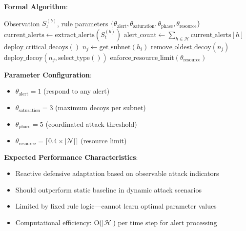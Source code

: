 \documentclass[12pt,oneside]{article}
\begin{document}
\textbf{Formal Algorithm}:
\begin{algorithm}[H]
\caption{Rule-Based Adaptive Defense}
\label{alg:rule_baseline}
\begin{algorithmic}[1]
\REQUIRE Observation $S_t^{(b)}$, rule parameters $\{\theta_{\text{alert}}, \theta_{\text{saturation}}, \theta_{\text{phase}}, \theta_{\text{resource}}\}$
\STATE $\text{current\_alerts} \leftarrow \text{extract\_alerts}(S_t^{(b)})$
\STATE $\text{alert\_count} \leftarrow \sum_{h \in \mathcal{H}} \text{current\_alerts}[h]$
    \STATE $\text{deploy\_critical\_decoys}()$ 
\ELSE
        \STATE $n_j \leftarrow \text{get\_subnet}(h_i)$
            \STATE $\text{remove\_oldest\_decoy}(n_j)$ 
        \ENDIF
        \STATE $\text{deploy\_decoy}(n_j, \text{select\_type}())$ 
    \ENDFOR
\ENDIF
\STATE $\text{enforce\_resource\_limit}(\theta_{\text{resource}})$ 
\end{algorithmic}
\end{algorithm}

\textbf{Parameter Configuration}:
\begin{itemize}
    \item $\theta_{\text{alert}} = 1$ (respond to any alert)
    \item $\theta_{\text{saturation}} = 3$ (maximum decoys per subnet)
    \item $\theta_{\text{phase}} = 5$ (coordinated attack threshold)  
    \item $\theta_{\text{resource}} = \lceil 0.4 \times |\mathcal{N}| \rceil$ (resource limit)
\end{itemize}

\textbf{Expected Performance Characteristics}:
\begin{itemize}
    \item Reactive defensive adaptation based on observable attack indicators
    \item Should outperform static baseline in dynamic attack scenarios
    \item Limited by fixed rule logic—cannot learn optimal parameter values
    \item Computational efficiency: O($|\mathcal{H}|$) per time step for alert processing
\end{itemize}
\end{document}
